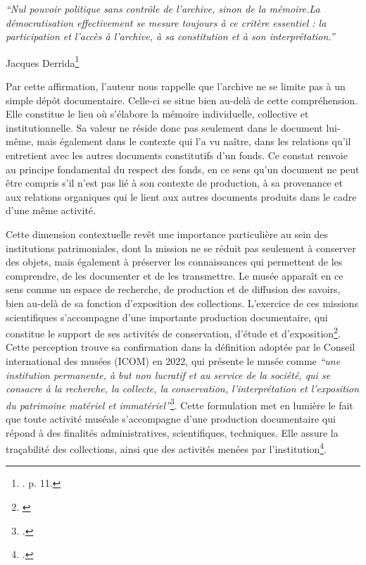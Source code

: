 \begin{displayquote}
	\textit{\enquote{Nul pouvoir politique sans contrôle de l'archive, sinon de la mémoire.La démocratisation effectivement se mesure toujours à ce critère essentiel : la participation et l'accès à l'archive, à sa constitution et à son interprétation.}}
	
	\par 
	Jacques Derrida\footnote{\cite{derrida-1995}. p. 11.} \\[0.2cm]
\end{displayquote}




Par cette affirmation, l'auteur nous rappelle que l'archive ne se limite pas à un simple dépôt documentaire. Celle-ci se situe bien au-delà de cette compréhension. Elle constitue le lieu où s'élabore la mémoire individuelle, collective et institutionnelle. Sa valeur ne réside donc pas seulement dans le document lui-même, mais également dans le contexte qui l’a vu naître, dans les relations qu’il entretient avec les autres documents constitutifs d’un fonds. Ce constat renvoie au principe fondamental du respect des fonds, en ce sens qu’un document ne peut être compris s’il n’est pas lié à son contexte de production, à sa provenance et aux relations organiques qui le lient aux autres documents produits dans le cadre d’une même activité.

Cette dimension contextuelle revêt une importance particulière au sein des institutions patrimoniales, dont la mission ne se réduit pas seulement à conserver des objets, mais également à préserver les connaissances qui permettent de les comprendre, de les documenter et de les transmettre. Le musée apparaît en ce sens comme un espace de recherche, de production et de diffusion des savoirs, bien au-delà de sa fonction d’exposition des collections. L’exercice de ces missions scientifiques s’accompagne d’une importante production documentaire, qui constitue le support de ses activités de conservation, d’étude et d’exposition\footnote{\cite{maze-2017}}. Cette perception trouve sa confirmation dans la définition adoptée par le Conseil international des musées (ICOM) en 2022, qui présente le musée comme \textit{\enquote{une institution permanente, à but non lucratif et au service de la société, qui se consacre à la recherche, la collecte, la conservation, l’interprétation et l’exposition du patrimoine matériel et immatériel}}\footcite{icom-definition-2022}. Cette formulation met en lumière le fait que toute activité muséale s’accompagne d’une production documentaire qui répond à des finalités administratives, scientifiques, techniques. Elle assure la traçabilité des collections, ainsi que des activités menées par l’institution\footcite{barbant-et-al-2014}.

